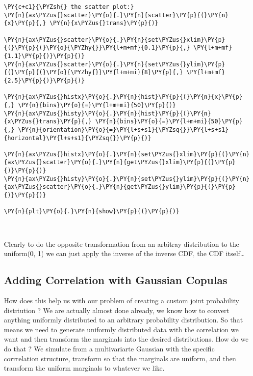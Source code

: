 \begin{tcolorbox}[breakable, size=fbox, boxrule=1pt, pad at break*=1mm,colback=cellbackground, colframe=cellborder]
\begin{Verbatim}[commandchars=\\\{\}]
\PY{c+c1}{\PYZsh{} the scatter plot:}
\PY{n}{ax\PYZus{}scatter}\PY{o}{.}\PY{n}{scatter}\PY{p}{(}\PY{n}{x}\PY{p}{,} \PY{n}{x\PYZus{}trans}\PY{p}{)}

\PY{n}{ax\PYZus{}scatter}\PY{o}{.}\PY{n}{set\PYZus{}xlim}\PY{p}{(}\PY{p}{(}\PY{o}{\PYZhy{}}\PY{l+m+mf}{0.1}\PY{p}{,} \PY{l+m+mf}{1.1}\PY{p}{)}\PY{p}{)}
\PY{n}{ax\PYZus{}scatter}\PY{o}{.}\PY{n}{set\PYZus{}ylim}\PY{p}{(}\PY{p}{(}\PY{o}{\PYZhy{}}\PY{l+m+mi}{8}\PY{p}{,} \PY{l+m+mf}{2.5}\PY{p}{)}\PY{p}{)}

\PY{n}{ax\PYZus{}histx}\PY{o}{.}\PY{n}{hist}\PY{p}{(}\PY{n}{x}\PY{p}{,} \PY{n}{bins}\PY{o}{=}\PY{l+m+mi}{50}\PY{p}{)}
\PY{n}{ax\PYZus{}histy}\PY{o}{.}\PY{n}{hist}\PY{p}{(}\PY{n}{x\PYZus{}trans}\PY{p}{,} \PY{n}{bins}\PY{o}{=}\PY{l+m+mi}{50}\PY{p}{,} \PY{n}{orientation}\PY{o}{=}\PY{l+s+s1}{\PYZsq{}}\PY{l+s+s1}{horizontal}\PY{l+s+s1}{\PYZsq{}}\PY{p}{)}

\PY{n}{ax\PYZus{}histx}\PY{o}{.}\PY{n}{set\PYZus{}xlim}\PY{p}{(}\PY{n}{ax\PYZus{}scatter}\PY{o}{.}\PY{n}{get\PYZus{}xlim}\PY{p}{(}\PY{p}{)}\PY{p}{)}
\PY{n}{ax\PYZus{}histy}\PY{o}{.}\PY{n}{set\PYZus{}ylim}\PY{p}{(}\PY{n}{ax\PYZus{}scatter}\PY{o}{.}\PY{n}{get\PYZus{}ylim}\PY{p}{(}\PY{p}{)}\PY{p}{)}

\PY{n}{plt}\PY{o}{.}\PY{n}{show}\PY{p}{(}\PY{p}{)}
\end{Verbatim}
\end{tcolorbox}

    \begin{center}
    \end{center}
    { \hspace*{\fill} \\}
    
    Clearly to do the opposite transformation from an arbitray distribution
to the uniform(0, 1) we can just apply the inverse of the inverse CDF,
the CDF itself\ldots{}

\hypertarget{adding-correlation-with-gaussian-copulas}{%
\subsection{Adding Correlation with Gaussian
Copulas}\label{adding-correlation-with-gaussian-copulas}}

How does this help us with our problem of creating a custom joint
probability distriution ? We are actually almost done already, we know
how to convert anything uniformly distributed to an arbitrary
probability distribution. So that means we need to generate uniformly
distributed data with the correlation we want and then transform the
marginals into the desired distributions. How do we do that ? We
simulate from a multivariarte Gaussian with the specific corrrelation
structure, transform so that the marginals are uniform, and then
transform the uniform marginals to whatever we like.

